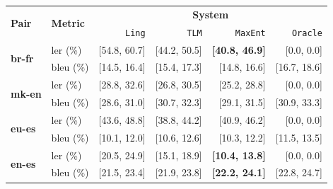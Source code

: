 \documentclass[25pt, a0paper, portrait, margin=0mm, innermargin=15mm,blockverticalspace=15mm, colspace=15mm, subcolspace=8mm]{tikzposter}
\begin{document}
\begin{columns}
{\begin{center}
  \begin{tabular}{|l|l|r|r|r||r|}
    \hline
    \multirow{2}{*}{{\bf Pair}}  & \multirow{2}{*}{{\bf Metric}} & \multicolumn{4}{|c|}{{\bf System}} \\ \cline{3-6}
                                 &              & {\tt Ling} & {\tt TLM} & \texttt{MaxEnt} & \texttt{Oracle} \\
    \hline %
    \multirow{2}{*}{{\bf br-fr}} & {\sc ler} (\%)     & [54.8, 60.7] & [44.2, 50.5]  & {\bf [40.8, 46.9]} & [0.0, 0.0]      \\ 
                                 & {\sc bleu} (\%)    & [14.5, 16.4] & [15.4, 17.3]  & [14.8, 16.6] & [16.7, 18.6]     \\ 
    \hline %
    \multirow{2}{*}{{\bf mk-en}} & {\sc ler} (\%)     & [28.8, 32.6] & [26.8, 30.5]  & [25.2, 28.8] & [0.0, 0.0]    \\ 
                                 & {\sc bleu} (\%)    & [28.6, 31.0] & [30.7, 32.3]  & [29.1, 31.5] & [30.9, 33.3]    \\ 
    \hline %
    \multirow{2}{*}{{\bf eu-es}} & {\sc ler} (\%)      & [43.6, 48.8] & [38.8, 44.2]  & [40.9, 46.2] & [0.0, 0.0]     \\ 
                                 & {\sc bleu} (\%)     & [10.1, 12.0] & [10.6, 12.6]  & [10.3, 12.2] & [11.5, 13.5]     \\ 
    \hline %
    \multirow{2}{*}{{\bf en-es}} & {\sc ler} (\%)      & [20.5, 24.9] & [15.1, 18.9]  & {\bf [10.4, 13.8]} & [0.0, 0.0]     \\ 
                                 & {\sc bleu} (\%)     & [21.5, 23.4] & [21.9, 23.8]  & {\bf [22.2, 24.1]} & [22.8, 24.7]     \\ 
    \hline
  \end{tabular}

 \end{center}

}


\end{columns}
\end{document}

